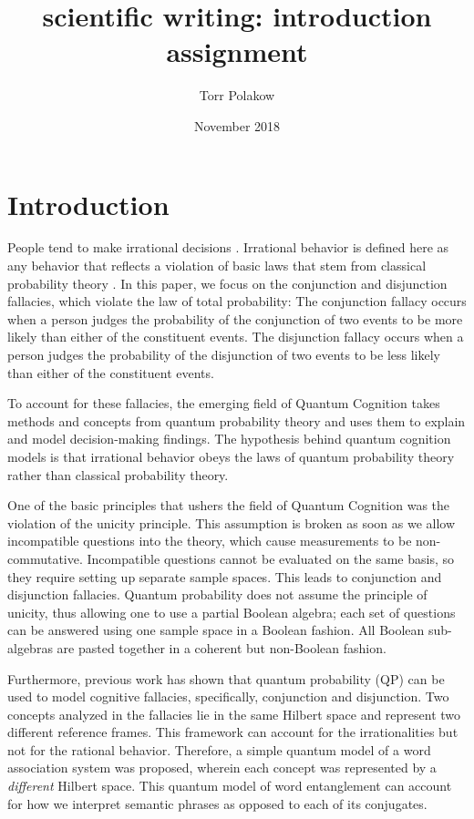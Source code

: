 \documentclass{article}
\title{scientific writing: introduction assignment}
\author{Torr Polakow}
\date{November 2018}
\begin{document}
\maketitle

\section{Introduction}

People tend to make irrational decisions . Irrational behavior is defined here as any behavior that reflects a violation of basic laws that stem from classical probability theory . In this paper, we focus on the conjunction and disjunction fallacies, which violate the law of total probability:
The conjunction fallacy occurs when a person judges the probability of the conjunction of two events to be more likely than either of the constituent events. 
The disjunction fallacy occurs when a person judges the probability of the disjunction of two events to be less likely than either of the constituent events.

To account for these fallacies, the emerging field of Quantum Cognition takes methods and concepts from quantum probability theory and uses them to explain and model decision-making findings. The hypothesis behind quantum cognition models is that irrational behavior obeys the laws of quantum probability theory rather than classical probability theory.

One of the basic principles that ushers the field of Quantum Cognition was the violation of the unicity principle.
This assumption is broken as soon as we allow incompatible questions into the theory, which cause measurements to be non-commutative. Incompatible questions cannot be evaluated on the same basis, so they require setting up separate sample spaces. This leads to conjunction and disjunction fallacies.
Quantum probability does not assume the principle of unicity, thus allowing one to use a partial Boolean algebra; each set of questions can be answered using one sample space in a Boolean fashion. 
All Boolean sub-algebras are pasted together in a coherent but non-Boolean fashion.

Furthermore, previous work has shown that quantum probability (QP) can be used to model cognitive fallacies, specifically, conjunction and disjunction. Two concepts analyzed in the fallacies lie in the same Hilbert space and represent two different reference frames. This framework can account for the irrationalities but not for the rational behavior.
Therefore, a simple quantum model of a word association system was proposed, wherein each concept was represented by a {\em different} Hilbert space. This quantum model of word entanglement can account for how we interpret semantic phrases as opposed to each of its conjugates.
\end{document}
